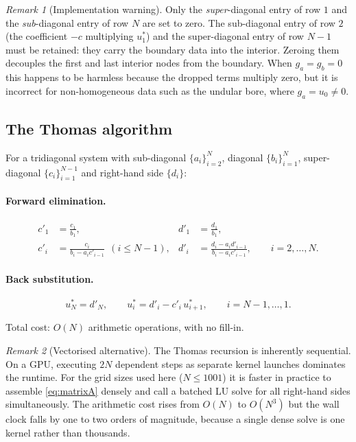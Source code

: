 \documentclass[11pt,a4paper]{article}
\theoremstyle{remark}
\newtheorem{remark}{Remark}
\newcommand{\us}{u^{*}}
\begin{document}
\begin{remark}[Implementation warning]
\label{rem:bcwarning}
Only the \emph{super}-diagonal entry of row $1$ and the \emph{sub}-diagonal entry
of row $N$ are set to zero. The sub-diagonal entry of row $2$ (the coefficient
$-c$ multiplying $\us_1$) and the super-diagonal entry of row $N-1$ must be
retained: they carry the boundary data into the interior. Zeroing them decouples
the first and last interior nodes from the boundary. When $g_a=g_b=0$ this
happens to be harmless because the dropped terms multiply zero, but it is
incorrect for non-homogeneous data such as the undular bore, where $g_a = u_0 \neq 0$.
\end{remark}

\subsection{The Thomas algorithm}

For a tridiagonal system with sub-diagonal $\{a_i\}_{i=2}^{N}$, diagonal
$\{b_i\}_{i=1}^{N}$, super-diagonal $\{c_i\}_{i=1}^{N-1}$ and right-hand side
$\{d_i\}$:

\paragraph{Forward elimination.}
\begin{align}
c'_1 &= \frac{c_1}{b_1}, &  d'_1 &= \frac{d_1}{b_1}, \\
c'_i &= \frac{c_i}{b_i - a_i c'_{i-1}}\ \ (i \le N-1), &
d'_i &= \frac{d_i - a_i d'_{i-1}}{b_i - a_i c'_{i-1}},
\qquad i = 2,\dots,N .
\end{align}

\paragraph{Back substitution.}
\begin{equation}
\us_N = d'_N, \qquad
\us_i = d'_i - c'_i\,\us_{i+1}, \qquad i = N-1,\dots,1 .
\end{equation}

Total cost: $O(N)$ arithmetic operations, with no fill-in.

\begin{remark}[Vectorised alternative]
The Thomas recursion is inherently sequential. On a GPU, executing $2N$
dependent steps as separate kernel launches dominates the runtime. For the grid
sizes used here ($N \leq 1001$) it is faster in practice to assemble
\eqref{eq:matrixA} densely and call a batched LU solve for all right-hand sides
simultaneously. The arithmetic cost rises from $O(N)$ to $O(N^3)$ but the wall
clock falls by one to two orders of magnitude, because a single dense solve is
one kernel rather than thousands.
\end{remark}
\end{document}
